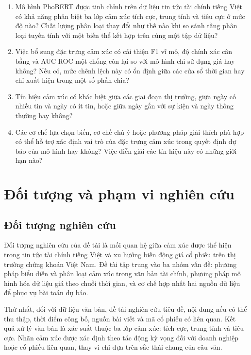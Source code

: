 \documentclass[12pt, a4paper, oneside]{report}
\begin{document}
\begin{enumerate}[nosep]
  \item Mô hình PhoBERT được tinh chỉnh trên dữ liệu tin tức tài chính tiếng Việt có khả năng phân
    biệt ba lớp cảm xúc tích cực, trung tính và tiêu cực ở mức độ nào? Chất lượng phân loại thay đổi như thế nào
    khi so sánh tầng phân loại tuyến tính với một biến thể kết hợp trên cùng một tập dữ liệu?
  \item Việc bổ sung đặc trưng cảm xúc có cải thiện F1 vĩ mô, độ chính xác cân bằng và
    AUC-ROC một-chống-còn-lại so với mô hình chỉ sử dụng giá hay không? Nếu có, mức chênh lệch này có
    ổn định giữa các cửa sổ thời gian hay chỉ xuất hiện trong một số phần chia?
  \item Tín hiệu cảm xúc có khác biệt giữa các giai đoạn thị trường, giữa ngày
    có nhiều tin và ngày có ít tin, hoặc giữa ngày gắn với sự kiện và ngày thông thường hay
    không?
  \item Các cơ chế lựa chọn biến, cơ chế chú ý hoặc phương pháp giải thích phù hợp có thể
    hỗ trợ xác định vai trò của đặc trưng cảm xúc trong quyết định dự báo của mô hình
    hay không? Việc diễn giải các tín hiệu này có những giới hạn nào?
\end{enumerate}
\section{Đối tượng và phạm vi nghiên cứu}
\label{sec:pham-vi}

\subsection{Đối tượng nghiên cứu}

Đối tượng nghiên cứu của đề tài là mối quan hệ giữa cảm xúc được thể hiện trong tin tức
tài chính tiếng Việt và xu hướng biến động giá cổ phiếu trên thị trường chứng khoán Việt
Nam. Đề tài tập trung vào ba nhóm vấn đề: phương pháp biểu diễn và phân loại cảm xúc
trong văn bản tài chính, phương pháp mô hình hóa dữ liệu giá theo chuỗi thời gian, và cơ
chế hợp nhất hai nguồn dữ liệu để phục vụ bài toán dự báo.

Thứ nhất, đối với dữ liệu văn bản, đề tài nghiên cứu tiêu đề, nội dung nếu có thể thu
thập, thời điểm công bố, nguồn bài viết và mã cổ phiếu có liên quan. Kết quả xử lý văn bản
là xác suất thuộc ba lớp cảm xúc: tích cực, trung tính và tiêu cực. Nhãn cảm xúc được xác
định theo tác động kỳ vọng đối với doanh nghiệp hoặc cổ phiếu liên quan, thay vì chỉ dựa
trên sắc thái chung của câu văn.
\end{document}
